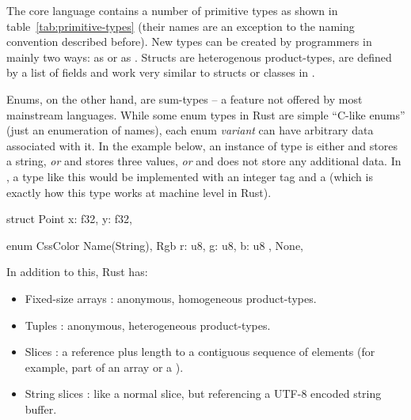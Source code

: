 The core language contains a number of primitive types as shown in table~\ref{tab:primitive-types} (their names are an exception to the naming convention described before).
New types can be created by programmers in mainly two ways: as  or as .
Structs are heterogenous product-types, are defined by a list of fields and work very similar to structs or classes in \cpp.

Enums, on the other hand, are sum-types -- a feature not offered by most mainstream languages.
While some enum types in Rust are simple \enquote{C-like enums} (just an enumeration of names), each enum \emph{variant} can have arbitrary data associated with it.
In the example below, an instance of type  is either  and stores a string, \emph{or}  and stores three  values, \emph{or}  and does not store any additional data.
In \cpp, a type like this would be implemented with an integer tag and a  (which is exactly how this type works at machine level in Rust).

\begin{center}
\begin{minipage}[t]{.45\textwidth}
\begin{rustcode}
struct Point {
    x: f32,
    y: f32,
}
\end{rustcode}
\end{minipage}
\begin{minipage}[t]{.45\textwidth}
\begin{rustcode}
enum CssColor {
    Name(String),
    Rgb { r: u8, g: u8, b: u8 },
    None,
}
\end{rustcode}
\end{minipage}
\end{center}

In addition to this, Rust has:
\vspace{-3mm}
\begin{itemize}
  \item Fixed-size arrays \code{[T; N]}: anonymous, homogeneous product-types.
  \item Tuples : anonymous, heterogeneous product-types.
  \item Slices \code{&[T]}: a reference plus length to a contiguous sequence of elements (for example, part of an array or a ).
  \item String slices : like a normal slice, but referencing a UTF-8 encoded string buffer.
\end{itemize}

